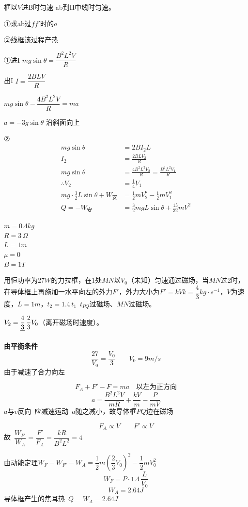 \begin{problem}
框以$V$进B时匀速 \quad ab到II中线时匀速。

①求ab过$ff'$时的$a$

②线框该过程产热
\begin{solution}
①进I \quad $mg\sin\theta=\dfrac{B^{2}L^{2}V}{R}$

出I \quad $I=\dfrac{2BLV}{R}$

$mg\sin\theta-\dfrac{4B^{2}L^{2}V}{R}=ma$

$a=-3g\sin\theta$ 沿斜面向上

②
\begin{align*}
mg\sin\theta&=2BI_2L\\
I_2&=\frac{2BLV_2}{R}\\
mg\sin\theta&=\frac{4B^{2}L^{2}V_2}{R}=\frac{B^{2}L^{2}V_1}{R}\\
\therefore V_2&=\frac14 V_1\\
mg\cdot\frac32 L\sin\theta+W_{\text{安}}&=\frac12 mV_2^{2}-\frac12 mV_1^{2}\\
Q=-W_{\text{安}}&=\frac32 mgL\sin\theta+\frac{15}{32}mV^{2}
\end{align*}
\end{solution}
\end{problem}

\begin{problem}

\noindent $m=0.4\unit{kg}$\\
$R=3\,\Omega$\\
$L=1\unit{m}$\\
$\mu=0$\\
$B=1\unit{T}$

用恒功率为$27\unit{W}$的力拉框，在$1$处$MN$以$V_0$（未知）匀速通过磁场，当$MN$过$2$时，在导体框上再施加一水平向左的外力$F'$，外力大小为$F'=kV$\quad $k=\dfrac{4}{3}\unit{kg\cdot s^{-1}}$，$V$为速度，$L=1\unit{m}$，{\small $t_2=1.4\,t_1$}\ $t_{PQ}$过磁场、$MN$过磁场。
\par\smallskip
$V_2=\struck{\dfrac{4}{3}}\,\dfrac{2}{3}V_0$（离开磁场时速度）。
\begin{solution}
\textbf{由平衡条件}
\[
\frac{27}{V_0}=\frac{V_0}{3}\qquad V_0=9\unit{m/s}
\]
\hfill {\small 由于减速了合力向左}\par %
\[
F_A+F'-F=ma\quad\text{以左为正方向}
\]
\[
a=\frac{B^2L^2V}{mR}+\frac{kV}{m}-\frac{P}{mV}
\]
$a$与$v$反向\ 应减速运动\ $a$随之减小，故导体框$PQ$边在磁场%

\[
F_A\propto V\qquad F'\propto V
\]
故\ $\dfrac{W_{F'}}{W_A}=\dfrac{F'}{F_A}=\dfrac{kR}{B^2L^2}=4$

由动能定理\quad $W_F-W_{F'}-W_A=\dfrac{1}{2}m\left(\dfrac{2}{3}V_0\right)^2-\dfrac{1}{2}mV_0^2$
\[
W_F=P\cdot 1.4\,\frac{L}{V_0}
\]
\[
W_A=2.64\unit{J}
\]
导体框产生的焦耳热\ $Q=W_A=2.64\unit{J}$
\end{solution}
\end{problem}

